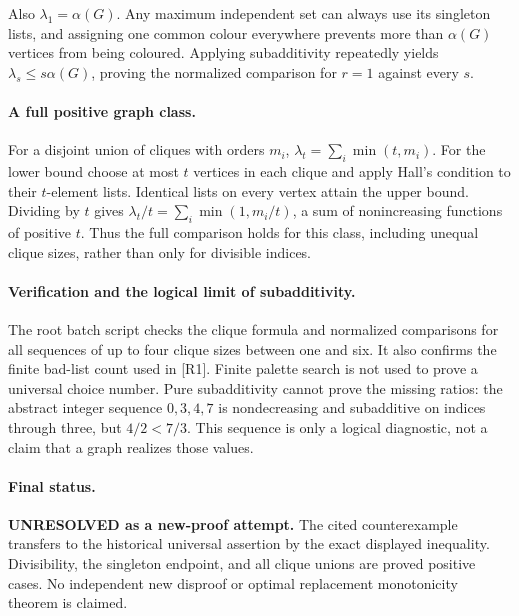 \documentclass[11pt,a4paper]{article}
\begin{document}
Also $\lambda_1=\alpha(G)$. Any maximum independent set can always use
its singleton lists, and assigning one common colour everywhere prevents
more than $\alpha(G)$ vertices from being coloured. Applying subadditivity
repeatedly yields $\lambda_s\le s\alpha(G)$, proving the normalized
comparison for $r=1$ against every $s$.

\paragraph{A full positive graph class.}
For a disjoint union of cliques with orders $m_i$,
$\lambda_t=\sum_i\min(t,m_i)$. For the lower bound choose at most $t$
vertices in each clique and apply Hall's condition to their $t$-element
lists. Identical lists on every vertex attain the upper bound. Dividing
by $t$ gives $\lambda_t/t=\sum_i\min(1,m_i/t)$, a sum of nonincreasing
functions of positive $t$. Thus the full comparison holds for this class,
including unequal clique sizes, rather than only for divisible indices.

\paragraph{Verification and the logical limit of subadditivity.}
The root batch script checks the clique formula and normalized comparisons
for all sequences of up to four clique sizes between one and six.
It also confirms the finite bad-list count used in [R1]. Finite palette
search is not used to prove a universal choice number.
Pure subadditivity cannot prove the missing ratios: the abstract integer
sequence $0,3,4,7$ is nondecreasing and subadditive on indices through
three, but $4/2<7/3$. This sequence is only a logical diagnostic, not a
claim that a graph realizes those values.

\paragraph{Final status.}
\textbf{UNRESOLVED as a new-proof attempt.} The cited counterexample
transfers to the historical universal assertion by the exact displayed
inequality. Divisibility, the singleton endpoint, and all clique unions
are proved positive cases. No independent new disproof or optimal
replacement monotonicity theorem is claimed.
\end{document}

